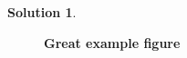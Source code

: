 \documentclass[letterpaper,12pt]{article}
\theoremstyle{definition}
\newtheorem{solution}[theorem]{Solution}
\begin{document}
\begin{solution}
\begin{figure}[htb]
  \end{figure}
  \begin{figure}[htb]\centering\captionsetup{width=4.0in}
    \caption{\textbf{Great example figure}}\label{}
  \end{figure}
\end{solution}
\end{document}
